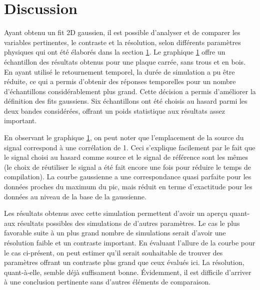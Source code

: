 \documentclass[conference]{IEEEtran}
\begin{document}



\section{Discussion}
Ayant obtenu un fit 2D gaussien, il est possible d'analyser et de comparer les variables pertinentes, 
le contraste et la résolution, selon différents paramètres physiques qui ont été élaborés dans la section \ref{}.
Le graphique \ref{} offre un échantillon des résultats obtenus pour une plaque carrée, sans trous et 
en bois. En ayant utilisé le retournement temporel, la durée de simulation a pu être réduite, ce qui a 
permis d'obtenir des réponses temporelles pour un nombre d'échantillons considérablement plus grand. 
Cette décision a permis d'améliorer la définition des fits gaussiens. Six échantillons ont été choisis au
hasard parmi les deux bandes considérées, offrant un poids statistique aux résultats assez important.

En observant le graphique \ref{}, on peut noter que l'emplacement de la source du signal
correspond à une corrélation de 1. Ceci s'explique facilement par le fait que le signal choisi au
hasard comme source et le signal de référence sont les mêmes (le choix de réutiliser le signal a été fait encore
une fois pour réduire le temps de compilation). La courbe gaussienne a une correspondance quasi parfaite pour les données
proches du maximum du pic, mais réduit en terme d'exactitude pour les données au niveau de la base
de la gaussienne.

Les résultats obtenus avec cette simulation permettent d'avoir un aperçu quant-aux
résultats possibles des simulations de d'autres paramètres. Le cas le plus favorable suite à 
un plus grand nombre de simulations serait d'avoir une résolution faible
et un contraste important. En évaluant l'allure de la courbe pour le cas ci-présent, on peut estimer
qu'il serait souhaitable de trouver des paramètres offrant un contraste plus grand que ceux évalués ici.
La résolution, quant-à-elle, semble déjà suffisament bonne. Évidemment, il est difficile d'arriver à une 
conclusion pertinente sans d'autres éléments de comparaison.



\clearpage

% 
% 
\end{document}
